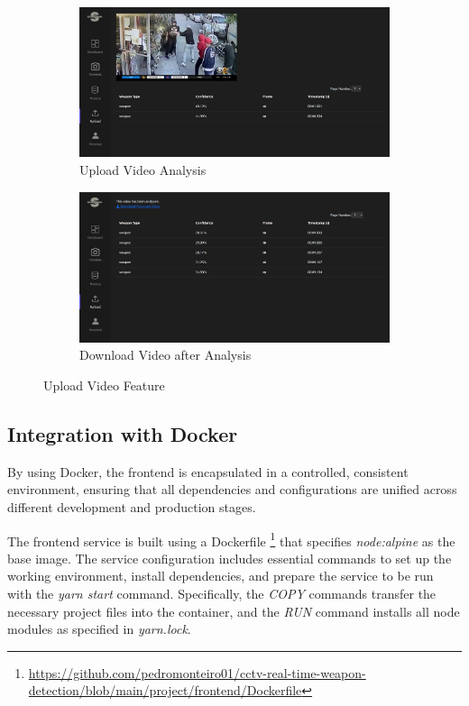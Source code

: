 \begin{figure}[h]
    \centering
    \begin{subfigure}[b]{0.49\textwidth}
        \centering
        \includegraphics[width=\linewidth]{figs/video-upload-analysis-page.png}
        \caption{Upload Video Analysis}
        \label{fig:upload-video-analysis}
    \end{subfigure}
    \hfill %
    \begin{subfigure}[b]{0.49\textwidth}
        \centering
        \includegraphics[width=\linewidth]{figs/download-video-page.png}
        \caption{Download Video after Analysis}
        \label{fig:download-video}
    \end{subfigure}
    \caption{Upload Video Feature}
    \label{fig:upload-video-section}
\end{figure}
\subsection{Integration with Docker}
By using Docker, the frontend is encapsulated in a controlled, consistent environment, ensuring that all 
dependencies and configurations are unified across different development and production stages.

The frontend service is built using a Dockerfile 
\footnote{\url{https://github.com/pedromonteiro01/cctv-real-time-weapon-detection/blob/main/project/frontend/Dockerfile}} 
that specifies \textit{node:alpine} as the base image. 
The service configuration includes essential commands to set up the 
working environment, install dependencies, and prepare the service to be run with the \textit{yarn start} command. 
Specifically, the \textit{COPY} commands transfer the necessary project files into the container, and the \textit{RUN} 
command installs all node modules as specified in \textit{yarn.lock}.


